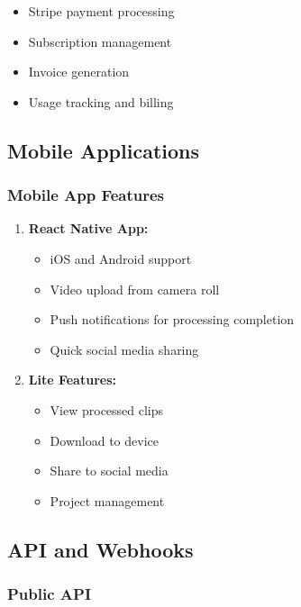 \begin{itemize}
    \item Stripe payment processing
    \item Subscription management
    \item Invoice generation
    \item Usage tracking and billing
\end{itemize}

\subsection{Mobile Applications}

\subsubsection{Mobile App Features}

\begin{enumerate}
    \item \textbf{React Native App:}
    \begin{itemize}
        \item iOS and Android support
        \item Video upload from camera roll
        \item Push notifications for processing completion
        \item Quick social media sharing
    \end{itemize}
    
    \item \textbf{Lite Features:}
    \begin{itemize}
        \item View processed clips
        \item Download to device
        \item Share to social media
        \item Project management
    \end{itemize}
\end{enumerate}

\subsection{API and Webhooks}

\subsubsection{Public API}

